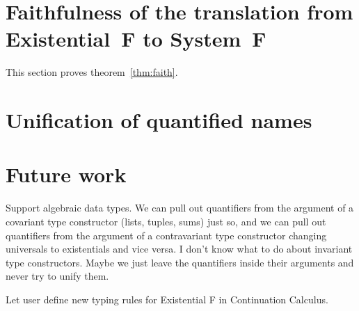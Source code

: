 \documentclass{amsart}
\begin{document}
\section{Faithfulness of the translation from Existential~F to
System~F}
\label{sec:faith}

This section proves theorem~\ref{thm:faith}.


\section{Unification of quantified names}
\label{sec:unify}

\section{Future work}

Support algebraic data types. We can pull out quantifiers from
the argument of a covariant type constructor (lists, tuples,
sums) just so, and we can pull out quantifiers from the argument
of a contravariant type constructor changing universals to
existentials and vice versa. I don't know what to do about
invariant type constructors. Maybe we just leave the quantifiers
inside their arguments and never try to unify them.

Let user define new typing rules for Existential F in
Continuation Calculus.
\end{document}
